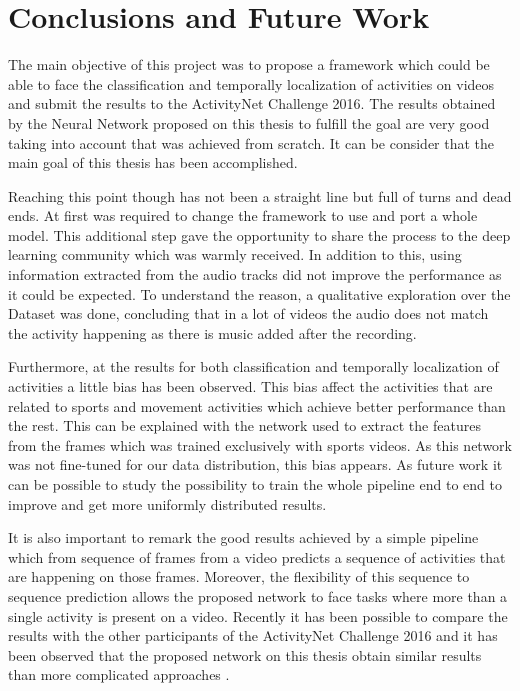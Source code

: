 \chapter{Conclusions and Future Work}

The main objective of this project was to propose a framework which could be able to face the classification and temporally localization of activities on videos and submit the results to the ActivityNet Challenge 2016. The results obtained by the Neural Network proposed on this thesis to fulfill the goal are very good taking into account that was achieved from scratch. It can be consider that the main goal of this thesis has been accomplished.

Reaching this point though has not been a straight line but full of turns and dead ends. At first was required to change the framework to use and port a whole model. This additional step gave the opportunity to share the process to the deep learning community which was warmly received. In addition to this, using information extracted from the audio tracks did not improve the performance as it could be expected. To understand the reason, a qualitative exploration over the Dataset was done, concluding that in a lot of videos the audio does not match the activity happening as there is music added after the recording. 

Furthermore, at the results for both classification and temporally localization of activities a little bias has been observed. This bias affect the activities that are related to sports and movement activities which achieve better performance than the rest. This can be explained with the network used to extract the features from the frames which was trained exclusively with sports videos. As this network was not fine-tuned for our data distribution, this bias appears. As future work it can be possible to study the possibility to train the whole pipeline end to end to improve and get more uniformly distributed results.

It is also important to remark the good results achieved by a simple pipeline which from sequence of frames from a video predicts a sequence of activities that are happening on those frames. Moreover, the flexibility of this sequence to sequence prediction allows the proposed network to face tasks where more than a single activity is present on a video. Recently it has been possible to compare the results with the other participants of the ActivityNet Challenge 2016 and it has been observed that the proposed network on this thesis obtain similar results than more complicated approaches \cite{singhmulti}.

